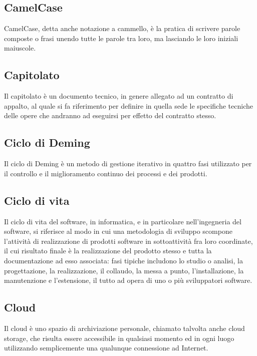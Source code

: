 
\subsection*{CamelCase}
CamelCase, detta anche notazione a cammello, è la pratica di scrivere parole composte o frasi unendo tutte le parole tra loro, ma lasciando le loro iniziali maiuscole.

\subsection*{Capitolato}
Il capitolato è un documento tecnico, in genere allegato ad un contratto di appalto, al quale si fa riferimento per definire in quella sede le specifiche tecniche delle opere che andranno ad eseguirsi per effetto del contratto stesso.

\subsection*{Ciclo di Deming}
Il ciclo di Deming è un metodo di gestione iterativo in quattro fasi utilizzato per il controllo e il miglioramento continuo dei processi e dei prodotti.

\subsection*{Ciclo di vita}
Il ciclo di vita del software, in informatica, e in particolare nell'ingegneria del software, si riferisce al modo in cui una metodologia di sviluppo scompone l'attività di realizzazione di prodotti software in sottoattività fra loro coordinate, il cui risultato finale è la realizzazione del prodotto stesso e tutta la documentazione ad esso associata: fasi tipiche includono lo studio o analisi, la progettazione, la realizzazione, il collaudo, la messa a punto, l'installazione, la manutenzione e l'estensione, il tutto ad opera di uno o più sviluppatori software.

\subsection*{Cloud}
Il cloud è uno spazio di archiviazione personale, chiamato talvolta anche cloud storage, che risulta essere accessibile in qualsiasi momento ed in ogni luogo utilizzando semplicemente una qualunque connessione ad Internet.


